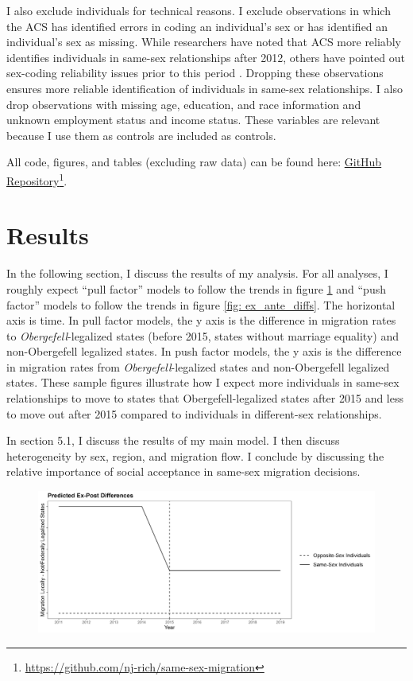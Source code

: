 \documentclass[12pt,letterpaper]{article}
\begin{document}
I also exclude individuals for technical reasons. I exclude observations in which the ACS has identified errors in coding an individual’s sex or has identified an individual’s sex as missing. While researchers have noted that ACS more reliably identifies individuals in same-sex relationships after 2012, others have pointed out sex-coding reliability issues prior to this period \citep{3, 5, 7, 12}. Dropping these observations ensures more reliable identification of individuals in same-sex relationships. I also drop observations with missing age, education, and race information and unknown employment status and income status. These variables are relevant because I use them as controls are included as controls. 

All code, figures, and tables (excluding raw data) can be found here: \href{https://github.com/nj-rich/same-sex-migration}{GitHub Repository}\footnote{\url{https://github.com/nj-rich/same-sex-migration}}.

\clearpage
\section{Results}
In the following section, I discuss the results of my analysis. For all analyses, I roughly expect “pull factor” models to follow the trends in figure \ref{fig: ex_post_diffs} and “push factor” models to follow the trends in figure \ref{fig: ex_ante_diffs}. The horizontal axis is time. In pull factor models, the y axis is the difference in migration rates to \textit{Obergefell}-legalized states (before 2015, states without marriage equality) and non-Obergefell legalized states. In push factor models, the y axis is the difference in migration rates from \textit{Obergefell}-legalized states and non-Obergefell legalized states. These sample figures illustrate how I expect more individuals in same-sex relationships to move to states that Obergefell-legalized states after 2015 and less to move out after 2015 compared to individuals in different-sex relationships.

In section 5.1, I discuss the results of my main model. I then discuss heterogeneity by sex, region, and migration flow. I conclude by discussing the relative importance of social acceptance in same-sex migration decisions.

\begin{figure}[htbp]
    \includegraphics[width=0.75\linewidth]{outputs/summary_stats/ex_post_diffs.png}
    \centering
    \caption{}
    \label{fig: ex_post_diffs}
\end{figure}
\end{document}
